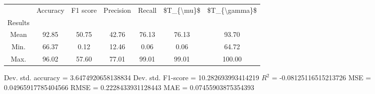 \begin{tabular}{|c|c|c|c|c|c|c|}
\toprule
{} &  Accuracy &  F1 score &  Precision &  Recall &  \$T\_\{\textbackslash mu\}\$ &  \$T\_\{\textbackslash gamma\}\$ \\
Results &           &           &            &         &            &               \\
\hline
Mean    &     92.85 &     50.75 &      42.76 &   76.13 &      76.13 &         93.70 \\
Min.    &     66.37 &      0.12 &      12.46 &    0.06 &       0.06 &         64.72 \\
Max.    &     96.02 &     57.60 &      77.01 &   99.01 &      99.01 &        100.00 \\
\bottomrule
\end{tabular}

 Dev. std. accuracy = 3.6474920658138834
 Dev. std. F1-score = 10.282693993414219
 $R^2$ = -0.08125116515213726
 MSE = 0.04965917785404566
 RMSE = 0.2228433931128443
 MAE = 0.07455903875354393